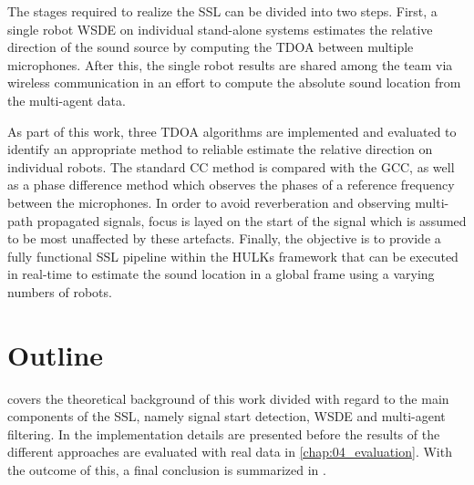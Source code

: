 The stages required to realize the \ac{SSL} can be divided into two steps.
First, a single robot \acf{WSDE} on individual stand-alone systems estimates the
relative direction of the sound source by computing the \ac{TDOA} between
multiple microphones. After this, the single robot results are shared among the team
via wireless communication in an effort to compute the absolute sound location
from the multi-agent data.


As part of this work, three \ac{TDOA} algorithms are implemented and evaluated
to identify an appropriate method to reliable estimate the relative direction
on individual robots. The standard \acf{CC} method is compared with the
\acf{GCC}, as well as a phase difference method which observes the phases of a reference
frequency between the microphones. In order to avoid reverberation and
observing multi-path propagated signals, focus is layed on the start of the
signal which is assumed to be most unaffected by these artefacts. Finally, the
objective is to provide a fully functional \ac{SSL} pipeline within the HULKs
framework that can be executed in real-time to estimate the sound location in
a global frame using a varying numbers of robots.


\section{Outline}
\label{sec:01_outline}

 covers the theoretical background of this work
divided with regard to the main components of the \ac{SSL}, namely signal start detection,
\ac{WSDE} and multi-agent filtering.
In  the implementation details are presented before
the results of the different approaches are evaluated with real data in \cref{chap:04_evaluation}.
With the outcome of this, a final conclusion is summarized in .